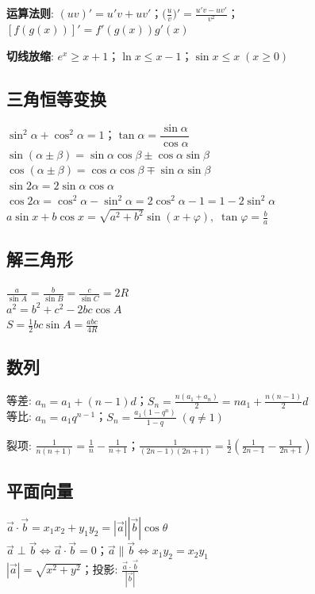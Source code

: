 \documentclass[12pt,a4paper,twocolumn]{ctexart}
\begin{document}
\textbf{运算法则}: $(uv)'=u'v+uv'$；$\big(\frac{u}{v}\big)'=\frac{u'v-uv'}{v^2}$；$[f(g(x))]'=f'(g(x))g'(x)$

\textbf{切线放缩}: $e^x\ge x+1$；$\ln x\le x-1$；$\sin x\le x\;(x\ge0)$

\subsection*{三角恒等变换}
$\sin^2\alpha+\cos^2\alpha=1$；$\tan\alpha=\dfrac{\sin\alpha}{\cos\alpha}$ \\
$\sin(\alpha\pm\beta)=\sin\alpha\cos\beta\pm\cos\alpha\sin\beta$ \\
$\cos(\alpha\pm\beta)=\cos\alpha\cos\beta\mp\sin\alpha\sin\beta$ \\
$\sin2\alpha=2\sin\alpha\cos\alpha$ \\
$\cos2\alpha=\cos^2\alpha-\sin^2\alpha=2\cos^2\alpha-1=1-2\sin^2\alpha$ \\
$a\sin x+b\cos x=\sqrt{a^2+b^2}\sin(x+\varphi),\;\tan\varphi=\frac{b}{a}$

\subsection*{解三角形}
$\frac{a}{\sin A}=\frac{b}{\sin B}=\frac{c}{\sin C}=2R$ \\
$a^2=b^2+c^2-2bc\cos A$ \\
$S=\frac12bc\sin A=\frac{abc}{4R}$

\subsection*{数列}
等差: $a_n=a_1+(n-1)d$；$S_n=\frac{n(a_1+a_n)}{2}=na_1+\frac{n(n-1)}{2}d$ \\
等比: $a_n=a_1q^{n-1}$；$S_n=\frac{a_1(1-q^n)}{1-q}\;(q\neq1)$

裂项: $\frac1{n(n+1)}=\frac1n-\frac1{n+1}$；$\frac1{(2n-1)(2n+1)}=\frac12(\frac1{2n-1}-\frac1{2n+1})$

\subsection*{平面向量}
$\vec{a}\cdot\vec{b}=x_1x_2+y_1y_2=|\vec{a}||\vec{b}|\cos\theta$ \\
$\vec{a}\perp\vec{b}\iff\vec{a}\cdot\vec{b}=0$；$\vec{a}\parallel\vec{b}\iff x_1y_2=x_2y_1$ \\
$|\vec{a}|=\sqrt{x^2+y^2}$；投影: $\frac{\vec{a}\cdot\vec{b}}{|\vec{b}|}$
\end{document}
